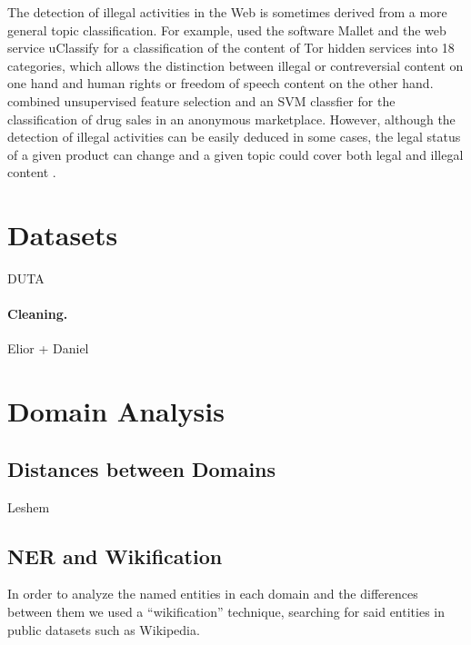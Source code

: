 \documentclass[11pt,a4paper]{article}
\begin{document}
The detection of illegal activities in the Web is sometimes derived from a more general topic classification. For example, \citet{Biryukov14} used the software Mallet \citep{McCallum02} and the web service uClassify \citep{Kagstrom13} for a classification of the content of Tor hidden services into 18 categories, which allows the distinction between illegal or contreversial content on one hand and human rights or freedom of speech content on the other hand. \citet{GraczykKinningham15} combined unsupervised feature selection and an SVM classfier for the classification of drug sales in an anonymous marketplace. However, although the detection of illegal activities can be easily deduced in some cases, the legal status of a given product can change \citep{GraczykKinningham15} and a given topic could cover both legal and illegal content \citep{AlNabki17,Avarikioti18}.





\section{Datasets}

DUTA \citep{AlNabki17}

\paragraph{Cleaning.} Elior + Daniel

\section{Domain Analysis}

\subsection{Distances between Domains}

Leshem



\subsection{NER and Wikification}

In order to analyze the named entities in each domain and the differences
between them we used a ``wikification'' technique, searching for
said entities in public datasets such as Wikipedia. 
\end{document}
